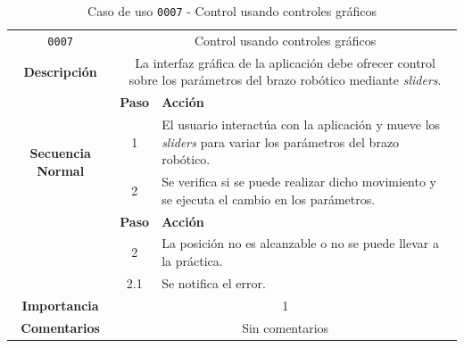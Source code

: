 \begin{table}[H]
    \centering
    \begin{tabularx}{\textwidth}{|c|c|X|}
        \cline{1-3}
        \texttt{0007}        & \multicolumn{2}{c|}{Control usando controles gráficos}                                      
        \\ \cline{1-3}
        \textbf{Descripción} & \multicolumn{2}{m{13cm}|}{La interfaz gráfica de la aplicación debe ofrecer control sobre los parámetros del brazo robótico mediante \textit{sliders}.}
        \\ \cline{1-3}
        \multirow{4}{*}{\textbf{Secuencia Normal}} & \textbf{Paso} & \textbf{Acción}
        \\ \cline{2-3}                    &   1  & El usuario interactúa con la aplicación y mueve los \textit{sliders} para variar los parámetros del brazo robótico.
        \\ \cline{2-3}                    &   2  & Se verifica si se puede realizar dicho movimiento y se ejecuta el cambio en los parámetros.
        \\ \cline{1-3}
        \multirow{2}{*}{\textbf{Excepciones}} & \textbf{Paso} & \textbf{Acción}
        \\ \cline{2-3}                    &   2   &  La posición no es alcanzable o no se puede llevar a la práctica.
        \\ \cline{2-3}                    &  2.1  &  Se notifica el error.
        \\ \cline{1-3}
        \textbf{Importancia}                 & \multicolumn{2}{c|}{1}           
        \\ \cline{1-3}
        \textbf{Comentarios}                 & \multicolumn{2}{c|}{Sin comentarios}
        \\ \cline{1-3}
    \end{tabularx}
    \caption{Caso de uso \texttt{0007} - Control usando controles gráficos}
    \label{tab:CU0007}
    \label{tab:caso_de_uso_control_usando_controles_graficos}
\end{table}

